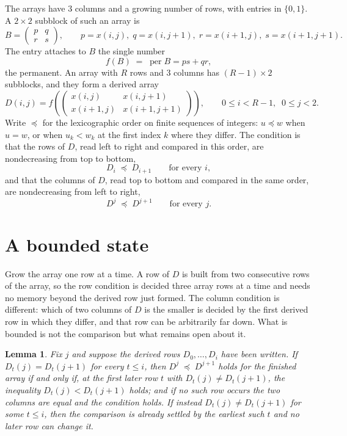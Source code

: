 \documentclass[11pt,a4paper]{article}
\theoremstyle{plain}
\newtheorem{lemma}[theorem]{Lemma}
\theoremstyle{definition}
\begin{document}
The arrays have $3$ columns and a growing number of rows, with entries in $\{0,1\}$. A
$2\times2$ subblock of such an array is
\[
B=\begin{pmatrix} p & q \\ r & s \end{pmatrix},
\qquad p=x(i,j),\; q=x(i,j+1),\; r=x(i+1,j),\; s=x(i+1,j+1).
\]
The entry attaches to $B$ the single number
\[
f(B)\;=\;\operatorname{per}B=ps+qr,
\]
the permanent. An array with $R$ rows and $3$ columns has $(R-1)\times2$ subblocks, and they
form a derived array
\[
D(i,j)=f\!\left(\begin{pmatrix} x(i,j) & x(i,j+1) \\ x(i+1,j) & x(i+1,j+1)\end{pmatrix}
\right),\qquad 0\le i<R-1,\;\; 0\le j<2 .
\]
Write $\preceq$ for the lexicographic order on finite sequences of integers: $u\preceq w$ when
$u=w$, or when $u_k<w_k$ at the first index $k$ where they differ. The condition is that the
rows of $D$, read left to right and compared in this order, are nondecreasing from top to bottom,
\[
D_{i}\;\preceq\;D_{i+1}\qquad\text{for every } i,
\]
and that the columns of $D$, read top to bottom and compared in the same order, are nondecreasing
from left to right,
\[
D^{j}\;\preceq\;D^{j+1}\qquad\text{for every } j .
\]

\section{A bounded state}

Grow the array one row at a time. A row of $D$ is built from two consecutive rows of the array,
so the row condition is decided three array rows at a time and needs no memory beyond the
derived row just formed. The column condition is different: which of two columns of $D$ is the
smaller is decided by the first derived row in which they differ, and that row can be
arbitrarily far down. What is bounded is not the comparison but what remains open about it.

\begin{lemma}\label{lem:bits}
Fix $j$ and suppose the derived rows $D_0,\dots,D_i$ have been written. If $D_t(j)=D_t(j+1)$ for
every $t\le i$, then $D^{j}\;\preceq\;D^{j+1}$ holds for the finished array if and only if,
at the first later row $t$ with $D_t(j)\neq D_t(j+1)$, the inequality $D_t(j)<D_t(j+1)$
holds; and if no such row occurs the two columns are equal and the condition holds. If instead
$D_t(j)\neq D_t(j+1)$ for some $t\le i$, then the comparison is already settled by the earliest
such $t$ and no later row can change it.
\end{lemma}
\end{document}
